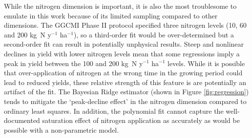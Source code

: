 \documentclass[gmd, manuscript]{copernicus} %
\begin{document}
While the nitrogen dimension is important, it is also the most troublesome to emulate in this work because of its limited sampling compared to other dimensions. 
The GGCMI Phase II protocol specified three nitrogen levels (10, 60 and 200 kg~N y$^{-1}$ ha$^{-1}$), so a third-order fit would be over-determined but a second-order fit can result in potentially unphysical results. 
Steep and nonlinear declines in yield with lower nitrogen levels mean that some regressions imply a peak in yield between the 100 and 200 kg~N y$^{-1}$ ha$^{-1}$ levels. 
While it is possible that over-application of nitrogen at the wrong time in the growing period could lead to reduced yields, these relative strength of this feature is are potentially an artifact of the fit. 
The Bayesian Ridge estimator (shown in Figure \ref{fig:regression}) tends to mitigate the `peak-decline effect' in the nitrogen dimension compared to ordinary least squares. 
In addition, the polynomial fit cannot capture the well-documented saturation effect of nitrogen application \citep[e.g.][]{Torsten77} as accurately as would be possible with a non-parametric model. 
\end{document}
